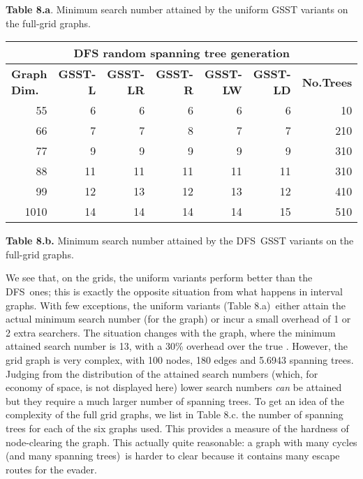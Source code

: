 \documentclass[11pt]{article}\usepackage{amsmath}
\begin{document}
\noindent\textbf{Table 8.a}. Minimum search number attained by the uniform
GSST variants on the full-grid graphs.

\begin{center}
\bigskip 

\begin{tabular}
[c]{|l|r|r|r|r|r|r|}\hline
\multicolumn{7}{|c|}{\textbf{DFS random spanning tree generation}}\\\hline
\textbf{Graph Dim.} & \textbf{GSST-L} & \textbf{GSST-LR} & \textbf{GSST-R} &
\textbf{GSST-LW} & \textbf{GSST-LD} & \textbf{No.Trees}\\\hline
\multicolumn{1}{|r|}{55} & 6 & 6 & 6 & 6 & 6 & 10\\\hline
\multicolumn{1}{|r|}{66} & 7 & 7 & 8 & 7 & 7 & 210\\\hline
\multicolumn{1}{|r|}{77} & 9 & 9 & 9 & 9 & 9 & 310\\\hline
\multicolumn{1}{|r|}{88} & 11 & 11 & 11 & 11 & 11 & 310\\\hline
\multicolumn{1}{|r|}{99} & 12 & 13 & 12 & 13 & 12 & 410\\\hline
\multicolumn{1}{|r|}{1010} & 14 & 14 & 14 & 14 & 15 & 510\\\hline
\end{tabular}



\end{center}

\noindent\textbf{Table 8.b. }Minimum search number attained by the DFS\ GSST
variants on the full-grid graphs.\bigskip

\begin{center}



\end{center}

We see that, on the grids, the uniform variants perform better than the
DFS\ ones; this is exactly the opposite situation from what happens in
interval graphs. With few exceptions, the uniform variants (Table 8.a)\ either
attain the actual minimum search number (for the  graph) or incur a
small overhead of 1 or 2 extra searchers. The situation changes with the
 graph, where the minimum attained search number is 13, with a
30\% overhead over the true . However, the  grid
graph is very complex, with 100 nodes, 180 edges and 5.6943
spanning trees. Judging from the distribution of the attained search numbers
(which, for economy of space, is not displayed here) lower search numbers
\emph{can} be attained but they require a much larger number of spanning
trees. To get an idea of the complexity of the full grid graphs, we list in
Table 8.c. the number of spanning trees for each of the six graphs used. This
provides a measure of the hardness of node-clearing the graph. This actually
quite reasonable: a graph with many cycles (and many spanning trees)\ is
harder to clear because it contains many escape routes for the evader.
\end{document}
